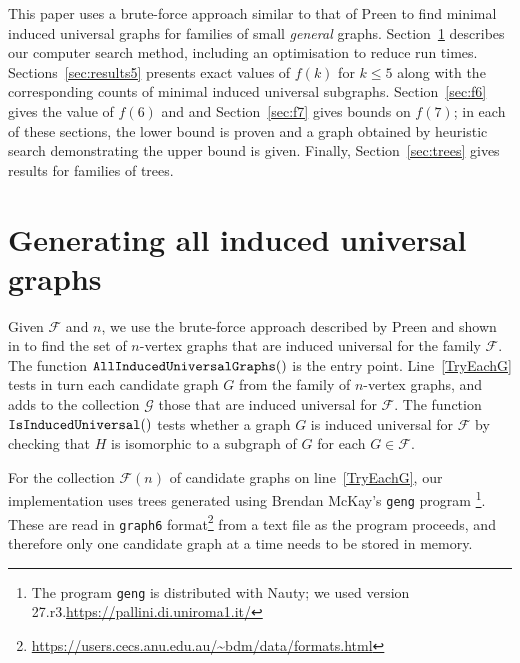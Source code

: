 \documentclass[12pt]{article}
\newcommand{\calF}{\ensuremath{\mathcal{F}}}
\newcommand{\calG}{\ensuremath{\mathcal{G}}}
\newcommand{\lineref}[1]{line~\ref{#1}}
\newcommand{\Lineref}[1]{Line~\ref{#1}}
\begin{document}
This paper uses a brute-force approach similar to that of Preen to find minimal
induced universal graphs for families of small \emph{general} graphs.
Section~\ref{sec:method} describes our computer search method, including an
optimisation to reduce run times.  Sections~\ref{sec:results5} presents exact
values of $f(k)$ for $k \leq 5$ along with
the corresponding counts of minimal induced universal subgraphs.
Section~\ref{sec:f6} gives the value of $f(6)$ and and
Section~\ref{sec:f7} gives bounds on $f(7)$; in each of these sections, the lower
bound is proven and a graph obtained by heuristic search demonstrating the
upper bound is given.  Finally, Section~\ref{sec:trees} gives results for
families of trees.

\section{Generating all induced universal graphs}\label{sec:method}

Given $\calF$ and $n$,
we use the brute-force approach described by Preen \cite{preen_math_se} and shown
in  to find the set of
$n$-vertex graphs that are induced universal for the family $\calF$.
The function $\FuncSty{AllInducedUniversalGraphs}()$ is the entry point.
\Lineref{TryEachG} tests in turn each candidate graph $G$ from the family
of $n$-vertex graphs, and adds to the collection $\calG$ those that are induced universal
for $\calF$.  The function $\FuncSty{IsInducedUniversal}()$ tests
whether a graph $G$ is induced universal for $\calF$ by checking that
$H$ is isomorphic to a subgraph of $G$ for each $G \in \calF$.

For the collection $\calF(n)$ of candidate graphs on \lineref{TryEachG}, our
implementation uses trees generated using Brendan McKay's \texttt{geng}
program \cite{DBLP:journals/jal/McKay98}
\footnote{The program \texttt{geng} is distributed
with Nauty; we used version 27.r3.\url{https://pallini.di.uniroma1.it/}}.
These are read in \texttt{graph6}
format\footnote{\url{https://users.cecs.anu.edu.au/~bdm/data/formats.html}}
from a text file as the program proceeds, and therefore only one candidate
graph at a time needs to be stored in memory.
\end{document}
